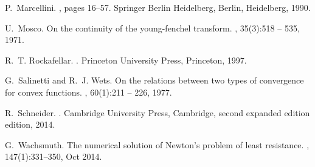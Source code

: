 \documentclass[14pt]{extarticle}
\theoremstyle{remark}
\theoremstyle{definition}
\begin{document}
\begin{thebibliography}{10}
P.~Marcellini.
, pages
  16--57.
\newblock Springer Berlin Heidelberg, Berlin, Heidelberg, 1990.

U.~Mosco.
\newblock On the continuity of the young-fenchel transform.
, 35(3):518 --
  535, 1971.

R.~T. Rockafellar.
.
\newblock Princeton University Press, Princeton, 1997.

G.~Salinetti and R.~J. Wets.
\newblock On the relations between two types of convergence for convex
  functions.
, 60(1):211 --
  226, 1977.

R.~Schneider.
.
\newblock Cambridge University Press, Cambridge, second expanded edition
  edition, 2014.

G.~Wachsmuth.
\newblock The numerical solution of {Newton}'s problem of least resistance.
, 147(1):331--350, Oct 2014.

\end{thebibliography}
\end{document}
